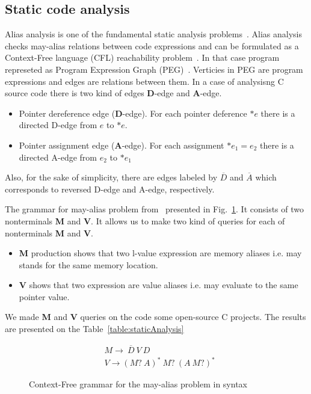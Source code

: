 \subsection{Static code analysis}

Alias analysis is one of the fundamental static analysis problems~\cite{Marlowe}.
Alias analysis checks may-alias relations between code expressions and can be formulated as a Context-Free language (CFL) reachability problem~\cite{Reps}.
In that case program represeted as Program Expression Graph (PEG)~\cite{Zheng}.
Verticies in PEG are program expressions and edges are relations between them.
In a case of analysisng C source code there is two kind of edges \textbf{D}-edge and \textbf{A}-edge.

\begin{itemize}
    \item Pointer dereference edge (\textbf{D}-edge). For each pointer deference $*e$ there is a directed D-edge from $e$ to $*e$.
    \item Pointer assignment edge (\textbf{A}-edge). For each assignment $*e_1=e_2$ there is a directed A-edge from $e_2$ to $*e_1$
\end{itemize}

Also, for the sake of simplicity, there are edges labeled by $\overline{D}$ and $\overline{A}$ which corresponds to reversed D-edge and A-edge, respectively.

The grammar for may-alias problem from~\cite{Zheng} presented in Fig.~\ref{lst:aliasGrammar}.
It consists of two nonterminals \textbf{M} and \textbf{V}.
It allows us to make two kind of queries for each of nonterminals \textbf{M} and \textbf{V}.

\begin{itemize}
    \item \textbf{M} production shows that two l-value expression are memory aliases i.e. may stands for the same memory location.
    \item \textbf{V} shows that two expression are value aliases i.e. may evaluate to the same pointer value.
\end{itemize}

We made \textbf{M} and \textbf{V} queries on the code some open-source C projects.
The results are presented on the Table~\ref{table:staticAnalysis} 

\begin{figure}[t]
\begin{align*}
& M \rightarrow\ \overline{D}\ V\ D\\
& V \rightarrow (M ?\ A)^{*} \ M?\ (A\ M?)^{*}
\end{align*}
\caption{Context-Free grammar for the may-alias problem in syntax}
\label{lst:aliasGrammar}
\end{figure}



